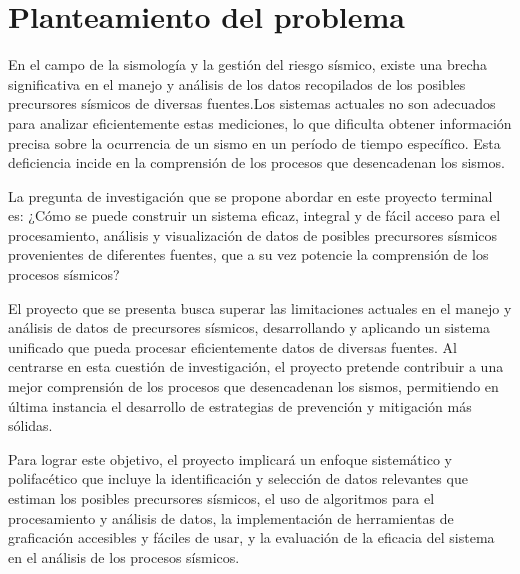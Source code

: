 \section{Planteamiento del problema}
En el campo de la sismología y la gestión del riesgo sísmico, existe una brecha significativa en el manejo y análisis de los datos recopilados de los posibles precursores sísmicos de diversas fuentes.Los sistemas actuales no son adecuados para analizar eficientemente estas mediciones, lo que dificulta obtener información precisa sobre la ocurrencia de un sismo en un período de tiempo específico. Esta deficiencia incide en la comprensión de los procesos que desencadenan los sismos.

La pregunta de investigación que se propone abordar en este proyecto terminal es: ¿Cómo se puede construir un sistema eficaz, integral y de fácil acceso para el procesamiento, análisis y visualización de datos de posibles precursores sísmicos provenientes de diferentes fuentes, que a su vez potencie la comprensión de los procesos sísmicos?

El proyecto que se presenta busca superar las limitaciones actuales en el manejo y análisis de datos de precursores sísmicos, desarrollando y aplicando un sistema unificado que pueda procesar eficientemente datos de diversas fuentes. Al centrarse en esta cuestión de investigación, el proyecto pretende contribuir a una mejor comprensión de los procesos que desencadenan los sismos, permitiendo en última instancia el desarrollo de estrategias de prevención y mitigación más sólidas.

Para lograr este objetivo, el proyecto implicará un enfoque sistemático y polifacético que incluye la identificación y selección de datos relevantes que estiman los posibles precursores sísmicos, el uso de algoritmos para el procesamiento y análisis de datos, la implementación de herramientas de graficación accesibles y fáciles de usar, y la evaluación de la eficacia del sistema en el análisis de los procesos sísmicos.